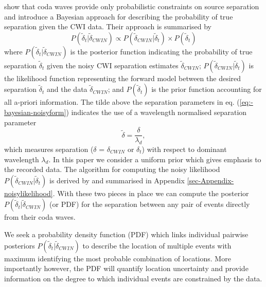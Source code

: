 \documentclass[extra]{gji}
\begin{document}
\citet{dr_Robinson11a} show that coda waves provide only
probabilistic constraints on source separation and introduce a
Bayesian approach for describing the probability of true separation
given the CWI data. Their approach is summarised by
\begin{equation}
\label{eq:-bayesian-noisyform}
P(\widetilde{\delta}_t|\widetilde{\delta}_{CWIN}) \propto P(\widetilde{\delta}_{CWIN}|\widetilde{\delta}_t)
\times P(\widetilde{\delta}_t)
\end{equation}
where  $P(\widetilde{\delta}_t|\widetilde{\delta}_{CWIN})$ is the posterior function
indicating the probability of true separation $\widetilde{\delta}_t$ given the noisy CWI separation
estimates $\widetilde{\delta}_{CWIN}$; $P(\widetilde{\delta}_{CWIN}|\widetilde{\delta}_t)$
is the likelihood function representing the forward model between the
desired separation $\widetilde{\delta}_t$ and the data $\widetilde{\delta}_{CWIN}$; and
$P(\widetilde{\delta}_t)$ is the prior function accounting for all a-priori information.
The tilde above the separation parameters in eq. (\ref{eq:-bayesian-noisyform})
indicates the use of a wavelength normalised separation parameter
\begin{equation}
\label{eq-normalisation-eqn}
\widetilde{\delta} = \frac{\delta}{\lambda_{d}},
\end{equation}
which measures separation ($\delta$ = $\delta_{CWIN}$ or $\delta_t$)
with respect to dominant wavelength $\lambda_{d}$. In this paper we
consider a uniform prior which gives emphasis to the recorded data.
The algorithm for computing the noisy likelihood
$P(\widetilde{\delta}_{CWIN}|\widetilde{\delta}_t)$ is derived by
\citet{dr_Robinson11a} and summarised in Appendix
\ref{sec-Appendix-noisylikelihood}. With these two pieces in place
we can compute the posterior
$P(\widetilde{\delta}_t|\widetilde{\delta}_{CWIN})$ (or PDF) for the
separation between any pair of events directly from their coda
waves.

We seek a probability density function (PDF) which links
 individual pairwise posteriors $P(\widetilde{\delta}_t|\widetilde{\delta}_{CWIN})$
to describe the location of multiple events with maximum identifying
 the most probable combination of locations.
More importantly however, the PDF will
quantify location uncertainty and provide information
on the degree to which individual events are constrained
 by the data.
\end{document}
